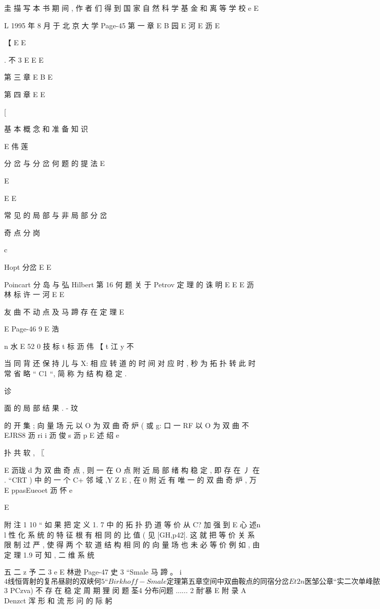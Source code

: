 圭 描 写 本 书 期 间 , 作 者 们 得 到 国 家 自 然 科 学 基 金 和 离 等 学 校
e
E

L
1995 年 8 月 于 北 京 大 学
Page-45
第 一 章
E
B 园
E 河
E 沥
E

【
E
E

. 不 3
E
E
E

第 三 章
E
B
E

第 四 章
E
E

[

基 本 概 念 和 准 备 知 识

E 伟 莲

分 岔 与 分 岔 何 题 的 提 法
E

E

E
E

常 见 的 局 部 与 非 局 部 分 岔

奇 点 分 岗

c

Hopt 分岔 E
E

Poincart 分 岛 与 弘 Hilbert 第 16 何 题
关 于 Petrov 定 理 的 诛 明
E
E
E 沥 林 标 许 一
河
E
E

友 曲 不 动 点 及 马 蹄 存 在 定 理
E

E
Page-46
9 E 浩

n
水
E
52 0 技 标 t 标 沥 伟
【 t 江 y 不

当 同 背 还 保 持 儿 与 X: 相 应 转 道 的 时 间 对 应 时 , 秒 为 拓 扑
转
此 时 常 省 略 “ C1 “, 简 称 为 结 构 稳 定 .

诊

面 的 局 部 结 果 . -
玟

的 开 集 ; 向 量 场 元 以 O 为 双 曲 奇 炉 ( 或 g: 口 一 RF 以 O 为 双 曲 不
EJRS8 沥 ri i 沥 俊 s 沥 p
E 述 绍 e

扑 共 软 , 〖

E 沥珑 d
为 双 曲 奇 点 , 则 一 在 O 点 附 近 局 部 绪 构 稳 定 , 即 存 在 丿 在 . “CRT )
中 的 一 个 C+ 邻 域 ,Y Z E , 在 0 附 近 有 唯 一 的 双 曲 奇 炉 , 万
E ppasEueoet 沥 怀 e

E

附 注 1 10 “ 如 果 把 定 义 1. 7 中 的 拓 扑 扔 道 等 价 从 C? 加 强 到
E 心 述n l
性 化 系 统 的 特 征 根 有 相 同 的 比 值 ( 见 [GH,p42]. 这 就 把 等 价 关 系
限 制 过 严 , 使 得 两 个 软 道 结 构 相 同 的 向 量 场 也 未 必 等 价 例 如 , 由
定 理 1.9 可 知 , 二 维 系 统

五 二 z 予 二 3
e
E 林逊
Page-47
史 3 “Smale 马 蹄 。 i
$ 4 线 恒 胥 射 的 复 吊 昼 尉 的 双 峡 何
5 “Birkhoff-Smale 定 理
第 五 章 空 间 中 双 曲 鞍 点 的 同 宿 分 岔
E t
2 n
医
邹 公 章 “ 实 二 次 单 峰 脓 射 旋 的 颂 引 子
E 河 玲
E 沥 沥 腾 3 浩 5
$ 3 PCzva) 不 存 在 稳 定 周 期 狸 闵 题
荃4 分布问题 ...... 2
耐′暴 E
附 录 A Denzct 浑 形 和 流 形 问 的 际 躬

